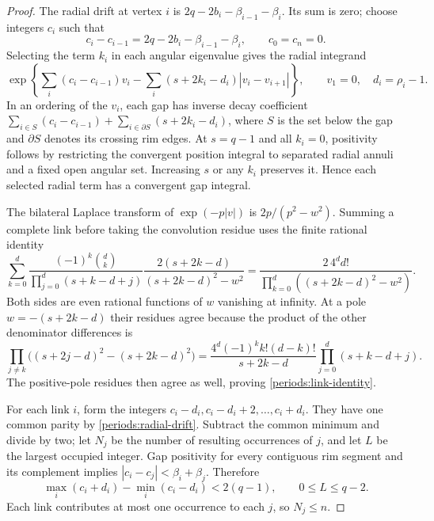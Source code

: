 \begin{proof}
The radial drift at vertex $i$ is
$2q-2b_i-\beta_{i-1}-\beta_i$.  Its sum is zero; choose integers $c_i$
such that
\begin{equation}
 c_i-c_{i-1}=2q-2b_i-\beta_{i-1}-\beta_i,
 \qquad c_0=c_n=0.
 \label{periods:radial-drift}
\end{equation}
Selecting the term $k_i$ in each angular eigenvalue gives the radial
integrand
\begin{equation}
 \exp\left\{\sum_i(c_i-c_{i-1})v_i
 -\sum_i(s+2k_i-d_i)|v_i-v_{i+1}|\right\},
 \qquad v_1=0,\quad d_i=\rho_i-1.
 \label{periods:radial-integrand}
\end{equation}
In an ordering of the $v_i$, each gap has inverse decay coefficient
$\sum_{i\in S}(c_i-c_{i-1})+
\sum_{i\in\partial S}(s+2k_i-d_i)$, where $S$ is the set below the
gap and $\partial S$ denotes its crossing rim edges.  At $s=q-1$ and
all $k_i=0$, positivity follows by restricting the convergent position
integral to separated radial annuli and a fixed open angular set.
Increasing $s$ or any $k_i$ preserves it.  Hence each selected radial
term has a convergent gap integral.

The bilateral Laplace transform of $\exp(-p|v|)$ is
$2p/(p^2-w^2)$.  Summing a complete link before taking the convolution
residue uses the finite rational identity
\begin{equation}
 \sum_{k=0}^{d}
 \frac{(-1)^k\binom dk}{\prod_{j=0}^{d}(s+k-d+j)}
 \frac{2(s+2k-d)}{(s+2k-d)^2-w^2}
 =\frac{2\,4^d d!}
 {\prod_{k=0}^{d}((s+2k-d)^2-w^2)}.
 \label{periods:link-identity}
\end{equation}
Both sides are even rational functions of $w$ vanishing at infinity.
At a pole $w=-(s+2k-d)$ their residues agree because the product of the
other denominator differences is
\begin{equation}
 \prod_{j\ne k}\bigl((s+2j-d)^2-(s+2k-d)^2\bigr)
 =\frac{4^d(-1)^k k!(d-k)!}{s+2k-d}
 \prod_{j=0}^{d}(s+k-d+j).
 \label{periods:link-residues}
\end{equation}
The positive-pole residues then agree as well, proving
\eqref{periods:link-identity}.

For each link $i$, form the integers
$c_i-d_i,c_i-d_i+2,\ldots,c_i+d_i$.  They have one common parity by
\eqref{periods:radial-drift}.  Subtract the common minimum and divide
by two; let $N_j$ be the number of resulting occurrences of $j$, and let
$L$ be the largest occupied integer.  Gap positivity for every contiguous
rim segment and its complement implies
$|c_i-c_j|<\beta_i+\beta_j$.  Therefore
\begin{equation}
 \max_i(c_i+d_i)-\min_i(c_i-d_i)<2(q-1),
 \qquad 0\le L\le q-2.
 \label{periods:residue-strip}
\end{equation}
Each link contributes at most one occurrence to each $j$, so $N_j\le n$.


\end{proof}
